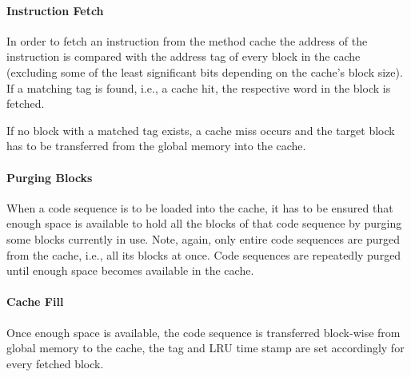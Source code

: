 \documentclass[a4paper,fontsize=10pt,twoside,DIV15,BCOR12mm,headinclude=true,footinclude=false,pagesize,bibtotoc]{scrbook}
\newcommand{\comment}[3]{

\textsf{\textbf{#1}} {\color{#3}#2}}
\newcommand{\martin}[1]{\comment{Martin}{#1}{Blue}}
\newcommand{\fb}[1]{\comment{Florian}{#1}{Emerald}}
\renewcommand{\martin}[1]{}
\renewcommand{\fb}[1]{}
\begin{document}
\fb{The time stamps could also be stored per code sequence in the cache. This
    might simplify the implementation of the LRU policy.}

\paragraph*{Instruction Fetch}
In order to fetch an instruction from the method cache the address of the
instruction is compared with the address tag of every block in the cache
(excluding some of the least significant bits depending on the cache's block
size). If a matching tag is found, i.e., a cache hit, the respective word in the
block is fetched.

If no block with a matched tag exists, a cache miss occurs and the target block
has to be transferred from the global memory into the cache.
\martin{We have cache misses on fetch in a LRU based method cache? I don't think so.}

\paragraph*{Purging Blocks}
When a code sequence is to be loaded into the cache, it has to be ensured that
enough space is available to hold all the blocks of that code sequence by
purging some blocks currently in use. Note, again, only entire code sequences
are purged from the cache, i.e., all its blocks at once. Code sequences are
repeatedly purged until enough space becomes available in the cache.

\paragraph*{Cache Fill}
Once enough space is available, the code sequence is transferred block-wise from
global memory to the cache, the tag and LRU time stamp are set accordingly for
every fetched block.

\martin{You might all know my position on an LRU based method cache, right?
It will be a plain mess to implement and maybe an issue on the HW
side (fully associative lookup at each fetch!). However, if one would
like to go this direction, it might be an interesting experiment.
One optimization point could be instead of the full associative lookup
on each fetch to have a translation table of block addresses to cache
blocks. This might add `just' another pipeline stage into the fetch
part.}

\martin{We could also think about doing the load/replacement
in SW - more like a managed ISPM.}
\end{document}

